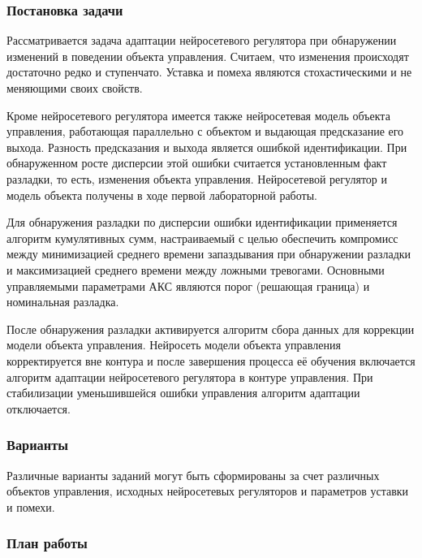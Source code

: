 \subsubsection{Постановка задачи}

Рассматривается задача адаптации нейросетевого регулятора при
обнаружении изменений в поведении объекта управления.  Считаем, что
изменения происходят достаточно редко и ступенчато.  Уставка и помеха
являются стохастическими и не меняющими своих свойств.

Кроме нейросетевого регулятора имеется также нейросетевая модель
объекта управления, работающая параллельно с объектом и выдающая
предсказание его выхода.  Разность предсказания и выхода является
ошибкой идентификации.  При обнаруженном росте дисперсии этой ошибки
считается установленным факт разладки, то есть, изменения объекта
управления.  Нейросетевой регулятор и модель объекта получены в ходе
первой лабораторной работы.

Для обнаружения разладки по дисперсии ошибки идентификации применяется
алгоритм кумулятивных сумм, настраиваемый с целью обеспечить
компромисс между минимизацией среднего времени запаздывания при
обнаружении разладки и максимизацией среднего времени между ложными
тревогами.  Основными управляемыми параметрами АКС являются порог
(решающая граница) и номинальная разладка.

После обнаружения разладки активируется алгоритм сбора данных для
коррекции модели объекта управления.  Нейросеть модели объекта
управления корректируется вне контура и после завершения процесса её
обучения включается алгоритм адаптации нейросетевого регулятора в
контуре управления.  При стабилизации уменьшившейся ошибки управления
алгоритм адаптации отключается.

\subsubsection{Варианты}

Различные варианты заданий могут быть сформированы за счет различных
объектов управления, исходных нейросетевых регуляторов и параметров
уставки и помехи.

\subsubsection{План работы}

